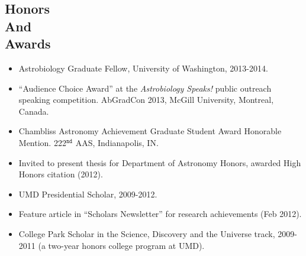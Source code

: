 \documentclass[margin]{res}
\begin{document}
\begin{resume}
\section{Honors\\And\\Awards} 
                 \begin{itemize}   
                  \item Astrobiology Graduate Fellow, University of Washington, 2013-2014.
                  \item ``Audience Choice Award'' at the \textit{Astrobiology Speaks!} public outreach speaking competition. AbGradCon 2013, McGill University, Montreal, Canada. 
                  \item Chambliss Astronomy Achievement Graduate Student Award Honorable Mention. 222$^{\mathtt{nd}}$ AAS, Indianapolis, IN.
		\item Invited to present thesis for Department of Astronomy Honors, awarded High Honors citation (2012).
                  \item UMD Presidential Scholar, 2009-2012.
		\item Feature article in ``Scholars Newsletter'' for research achievements (Feb 2012).
		\item College Park Scholar in the Science, Discovery and the Universe track, 2009-2011 (a two-year honors 
		college program at UMD). \\
                 \end{itemize}
                 


\end{resume}
\end{document}
